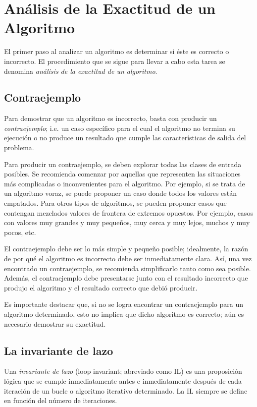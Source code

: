 \chapter{Análisis de la Exactitud de un Algoritmo}

El primer paso al analizar un algoritmo es determinar si éste es correcto
o incorrecto. El procedimiento que se sigue para llevar a cabo esta
tarea se denomina \emph{análisis de la exactitud de un algoritmo}.

\section{Contraejemplo}

Para demostrar que un algoritmo es incorrecto, basta con producir
un \emph{contraejemplo}; i.e. un caso específico para el cual el algoritmo
no termina su ejecución o no produce un resultado que cumple las características
de salida del problema. 

Para producir un contraejemplo, se deben explorar todas las clases
de entrada posibles. Se recomienda comenzar por aquellas que representen
las situaciones más complicadas o inconvenientes para el algoritmo. Por ejemplo, si
se trata de un algoritmo voraz, se puede proponer un caso donde todos
los valores están empatados. Para otros tipos de algoritmos, se pueden
proponer casos que contengan mezclados valores de frontera de extremos
opuestos. Por ejemplo, casos con valores muy grandes y muy pequeños,
muy cerca y muy lejos, muchos y muy pocos, etc.

El contraejemplo debe ser lo más simple y pequeño posible; idealmente,
la razón de por qué el algoritmo es incorrecto debe ser inmediatamente
clara. Así, una vez encontrado un contraejemplo, se recomienda simplificarlo
tanto como sea posible. Además, el contraejemplo debe presentarse
junto con el resultado incorrecto que produjo el algoritmo y el resultado
correcto que debió producir.

Es importante destacar que, si no se logra encontrar un contraejemplo
para un algoritmo determinado, esto no implica que dicho algoritmo
es correcto; aún es necesario demostrar su exactitud.

\section{La invariante de lazo}

Una \emph{invariante de lazo} (loop invariant; abreviado como IL) es una proposición
lógica que se cumple inmediatamente antes e inmediatamente después
de cada iteración de un bucle o algoritmo iterativo determinado. La
IL siempre se define en función del número de iteraciones.

